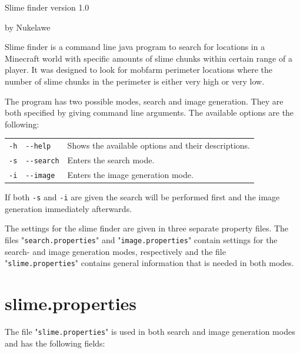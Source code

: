 \documentclass[12pt]{article}
\begin{document}
{\centering
{\huge Slime finder version 1.0}

{\Large by Nukelawe}\\
}
\vspace{2cm}
Slime finder is a command line java program to search for locations in a Minecraft world with specific amounts of slime chunks within certain range of a player. It was designed to look for mobfarm perimeter locations where the number of slime chunks in the perimeter is either very high or very low.

The program has two possible modes, search and image generation. They are both specified by giving command line arguments. The available options are the following:

\hspace{1.0cm}
\begin{tabular}{@{} l l l @{}}
\texttt{-h} & \texttt{-{}-help} & Shows the available options and their descriptions. \\
\texttt{-s} & \texttt{-{}-search} & Enters the search mode. \\
\texttt{-i} & \texttt{-{}-image} & Enters the image generation mode. \\
\end{tabular}

If both \texttt{-s} and \texttt{-i} are given the search will be performed first and the image generation immediately afterwards.

The settings for the slime finder are given in three separate property files. The files "\texttt{search.properties}" and "\texttt{image.properties}" contain settings for the search- and image generation modes, respectively and the file "\texttt{slime.properties}" contains general information that is needed in both modes.

\pagebreak
\section{\bfseries slime.properties}
The file "\texttt{slime.properties}" is used in both search and image generation modes and has the following fields:

\hspace{1.0cm}
\end{document}
